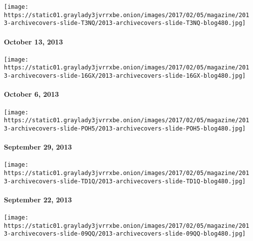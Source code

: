 \href{http://www.nytimes3xbfgragh.onion/indexes/2013/10/13/magazine/index.html}{}

\texttt{[image: https://static01.graylady3jvrrxbe.onion/images/2017/02/05/magazine/2013-archivecovers-slide-T3NQ/2013-archivecovers-slide-T3NQ-blog480.jpg]}

\hypertarget{october-13-2013}{%
\paragraph{October 13, 2013}\label{october-13-2013}}

\href{http://www.nytimes3xbfgragh.onion/indexes/2013/10/06/magazine/index.html}{}

\texttt{[image: https://static01.graylady3jvrrxbe.onion/images/2017/02/05/magazine/2013-archivecovers-slide-16GX/2013-archivecovers-slide-16GX-blog480.jpg]}

\hypertarget{october-6-2013}{%
\paragraph{October 6, 2013}\label{october-6-2013}}

\href{http://www.nytimes3xbfgragh.onion/indexes/2013/09/29/magazine/index.html}{}

\texttt{[image: https://static01.graylady3jvrrxbe.onion/images/2017/02/05/magazine/2013-archivecovers-slide-POH5/2013-archivecovers-slide-POH5-blog480.jpg]}

\hypertarget{september-29-2013}{%
\paragraph{September 29, 2013}\label{september-29-2013}}

\href{http://www.nytimes3xbfgragh.onion/indexes/2013/09/22/magazine/index.html}{}

\texttt{[image: https://static01.graylady3jvrrxbe.onion/images/2017/02/05/magazine/2013-archivecovers-slide-TD1Q/2013-archivecovers-slide-TD1Q-blog480.jpg]}

\hypertarget{september-22-2013}{%
\paragraph{September 22, 2013}\label{september-22-2013}}

\href{http://www.nytimes3xbfgragh.onion/indexes/2013/09/15/magazine/index.html}{}

\texttt{[image: https://static01.graylady3jvrrxbe.onion/images/2017/02/05/magazine/2013-archivecovers-slide-09QQ/2013-archivecovers-slide-09QQ-blog480.jpg]}

